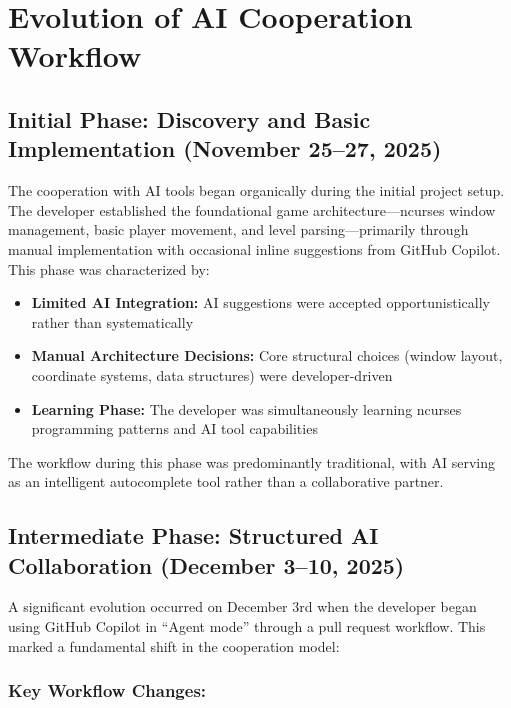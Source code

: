 \documentclass[12pt,a4paper]{article}
\begin{document}
\newpage

\section{Evolution of AI Cooperation Workflow}

\subsection{Initial Phase: Discovery and Basic Implementation (November 25--27, 2025)}

The cooperation with AI tools began organically during the initial project setup. The developer established the foundational game architecture---ncurses window management, basic player movement, and level parsing---primarily through manual implementation with occasional inline suggestions from GitHub Copilot. This phase was characterized by:

\begin{itemize}
    \item \textbf{Limited AI Integration:} AI suggestions were accepted opportunistically rather than systematically
    \item \textbf{Manual Architecture Decisions:} Core structural choices (window layout, coordinate systems, data structures) were developer-driven
    \item \textbf{Learning Phase:} The developer was simultaneously learning ncurses programming patterns and AI tool capabilities
\end{itemize}

The workflow during this phase was predominantly traditional, with AI serving as an intelligent autocomplete tool rather than a collaborative partner.

\subsection{Intermediate Phase: Structured AI Collaboration (December 3--10, 2025)}

A significant evolution occurred on December 3rd when the developer began using GitHub Copilot in ``Agent mode'' through a pull request workflow. This marked a fundamental shift in the cooperation model:

\subsubsection*{Key Workflow Changes:}
\end{document}
